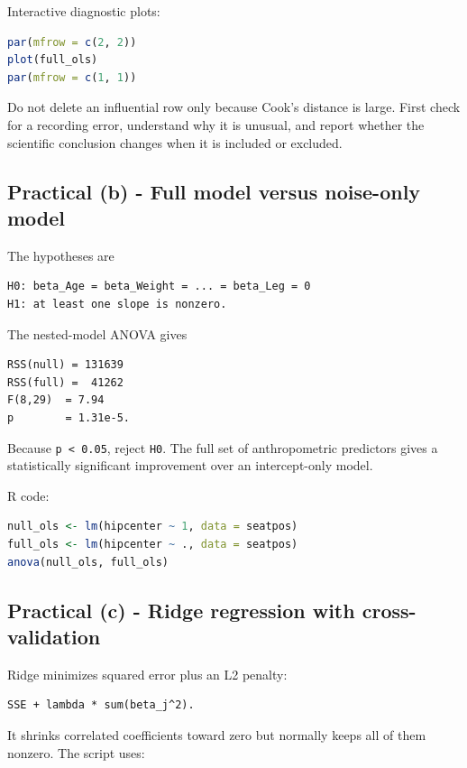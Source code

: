 ﻿\documentclass[11pt]{article}
\begin{document}
Interactive diagnostic plots:

\begin{lstlisting}[language=R]
par(mfrow = c(2, 2))
plot(full_ols)
par(mfrow = c(1, 1))
\end{lstlisting}

Do not delete an influential row only because Cook's distance is large. First
check for a recording error, understand why it is unusual, and report whether the
scientific conclusion changes when it is included or excluded.

\subsection{Practical (b) - Full model versus noise-only model}

The hypotheses are

\begin{lstlisting}
H0: beta_Age = beta_Weight = ... = beta_Leg = 0
H1: at least one slope is nonzero.
\end{lstlisting}

The nested-model ANOVA gives

\begin{lstlisting}
RSS(null) = 131639
RSS(full) =  41262
F(8,29)  = 7.94
p        = 1.31e-5.
\end{lstlisting}

Because \texttt{p < 0.05}, reject \texttt{H0}. The full set of anthropometric predictors gives
a statistically significant improvement over an intercept-only model.

R code:

\begin{lstlisting}[language=R]
null_ols <- lm(hipcenter ~ 1, data = seatpos)
full_ols <- lm(hipcenter ~ ., data = seatpos)
anova(null_ols, full_ols)
\end{lstlisting}

\subsection{Practical (c) - Ridge regression with cross-validation}

Ridge minimizes squared error plus an L2 penalty:

\begin{lstlisting}
SSE + lambda * sum(beta_j^2).
\end{lstlisting}

It shrinks correlated coefficients toward zero but normally keeps all of them
nonzero. The script uses:
\end{document}
